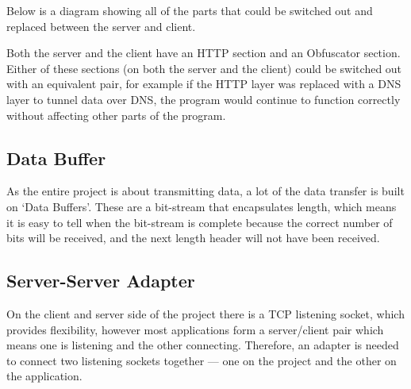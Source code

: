 Below is a diagram showing all of the parts that could be switched out and replaced between the server and client.
\begin{center}
\end{center}
Both the server and the client have an HTTP section and an Obfuscator section.
Either of these sections (on both the server and the client) could be switched out with an equivalent pair, for example if the HTTP layer was replaced with a DNS layer to tunnel data over DNS, the program would continue to function correctly without affecting other parts of the program.

\subsection{Data Buffer}
As the entire project is about transmitting data, a lot of the data transfer is built on `Data Buffers'. These are a bit-stream that encapsulates length, which means it is easy to tell when the bit-stream is complete because the correct number of bits will be received, and the next length header will not have been received.

\subsection{Server-Server Adapter}
On the client and server side of the project there is a TCP listening socket, which provides flexibility, however most applications form a server/client pair which means one is listening and the other connecting.
Therefore, an adapter is needed to connect two listening sockets together --- one on the project and the other on the application.
